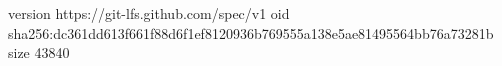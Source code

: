 version https://git-lfs.github.com/spec/v1
oid sha256:dc361dd613f661f88d6f1ef8120936b769555a138e5ae81495564bb76a73281b
size 43840
